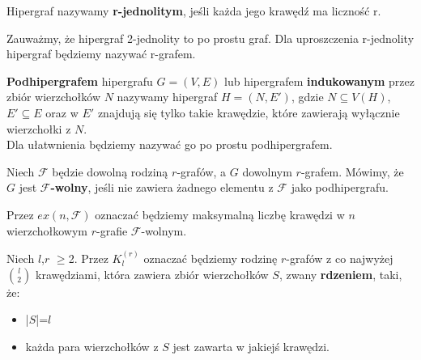 \documentclass[miz,woman]{mgrwms}
\begin{document}
\begin{defi}
 Hipergraf nazywamy \textbf{r-jednolitym}, jeśli każda jego krawędź ma liczność r.\\
\end{defi}
Zauważmy, że hipergraf 2-jednolity to po prostu graf.
Dla uproszczenia r-jednolity hipergraf będziemy nazywać r-grafem.\\
\begin{defi}
 \textbf{Podhipergrafem }hipergrafu $G=(V,E)$ lub hipergrafem \textbf{indukowanym} przez zbiór wierzchołków $N$ nazywamy hipergraf $H=(N,E')$, gdzie
$N \subseteq V(H)$, $E'\subseteq E$ oraz w $E'$ znajdują się tylko takie krawędzie, które zawierają wyłącznie wierzchołki z $N$.\\
Dla ułatwnienia będziemy nazywać go po prostu podhipergrafem.\\
\end{defi}
\begin{defi}
 Niech $\mathcal{F}$ będzie dowolną rodziną $r$-grafów, a $G$ dowolnym $r$-grafem. Mówimy, że $G$ jest \textbf{{$\mathcal{F}$}-wolny},
jeśli nie zawiera żadnego elementu z $\mathcal{F}$ jako podhipergrafu.
\\
\end{defi}

Przez \textbf{$ex(n,\mathcal{F})$} oznaczać będziemy maksymalną liczbę krawędzi w $n$ wierzchołkowym $r$-grafie $\mathcal{F}$-wolnym.\\
\begin{defi}
 Niech $l$,$r$ $\geq$2. Przez $K_l^{(r)}$ oznaczać będziemy rodzinę $r$-grafów z co najwyżej $l \choose 2$ krawędziami,
która zawiera zbiór wierzchołków $S$, zwany \textbf{rdzeniem}, taki, że:
\begin{itemize}
 \item |$S$|=$l$
 \item każda para wierzchołków z $S$ jest zawarta w jakiejś krawędzi.
\end{itemize}
\end{defi}
\end{document}

